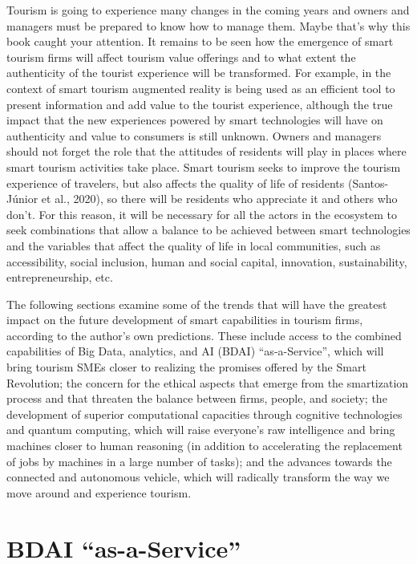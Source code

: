 \documentclass[
  letterpaper,
  DIV=11,
  numbers=noendperiod]{scrreprt}
\begin{document}
Tourism is going to experience many changes in the coming years and
owners and managers must be prepared to know how to manage them. Maybe
that's why this book caught your attention. It remains to be seen how
the emergence of smart tourism firms will affect tourism value offerings
and to what extent the authenticity of the tourist experience will be
transformed. For example, in the context of smart tourism augmented
reality is being used as an efficient tool to present information and
add value to the tourist experience, although the true impact that the
new experiences powered by smart technologies will have on authenticity
and value to consumers is still unknown. Owners and managers should not
forget the role that the attitudes of residents will play in places
where smart tourism activities take place. Smart tourism seeks to
improve the tourism experience of travelers, but also affects the
quality of life of residents (Santos-Júnior et al., 2020), so there will
be residents who appreciate it and others who don't. For this reason, it
will be necessary for all the actors in the ecosystem to seek
combinations that allow a balance to be achieved between smart
technologies and the variables that affect the quality of life in local
communities, such as accessibility, social inclusion, human and social
capital, innovation, sustainability, entrepreneurship, etc.

The following sections examine some of the trends that will have the
greatest impact on the future development of smart capabilities in
tourism firms, according to the author's own predictions. These include
access to the combined capabilities of Big Data, analytics, and AI
(BDAI) ``as-a-Service'', which will bring tourism SMEs closer to
realizing the promises offered by the Smart Revolution; the concern for
the ethical aspects that emerge from the smartization process and that
threaten the balance between firms, people, and society; the development
of superior computational capacities through cognitive technologies and
quantum computing, which will raise everyone's raw intelligence and
bring machines closer to human reasoning (in addition to accelerating
the replacement of jobs by machines in a large number of tasks); and the
advances towards the connected and autonomous vehicle, which will
radically transform the way we move around and experience tourism.

\hypertarget{bdai-as-a-service}{%
\section{BDAI ``as-a-Service''}\label{bdai-as-a-service}}
\end{document}

